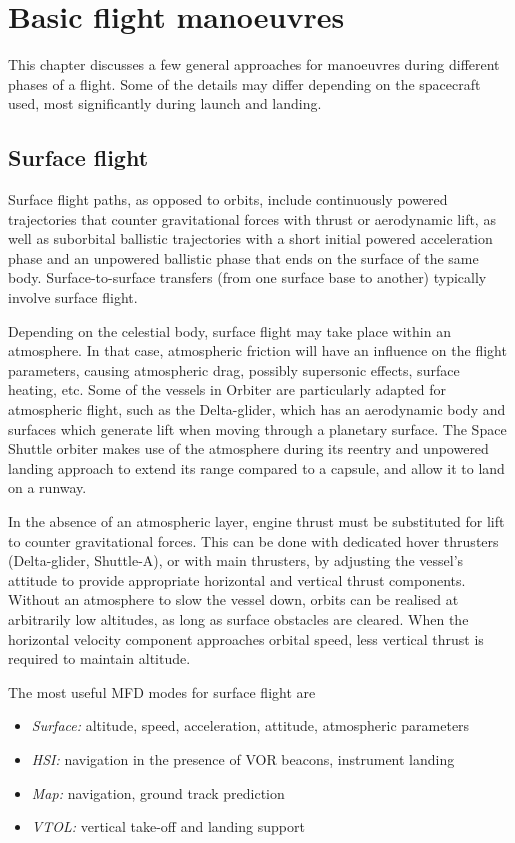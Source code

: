 \documentclass[Orbiter User Manual.tex]{subfiles}
\begin{document}
\section{Basic flight manoeuvres}
\label{sec:basic_flight}
This chapter discusses a few general approaches for manoeuvres during different
phases of a flight. Some of the details may differ depending on the spacecraft
used, most significantly during launch and landing.


\subsection{Surface flight}
Surface flight paths, as opposed to orbits, include continuously powered
trajectories that counter gravitational forces with thrust or aerodynamic lift,
as well as suborbital ballistic trajectories with a short initial powered
acceleration phase and an unpowered ballistic phase that ends on the surface of
the same body. Surface-to-surface transfers (from one surface base to another)
typically involve surface flight.

Depending on the celestial body, surface flight may take place within an
atmosphere. In that case, atmospheric friction will have an influence on the
flight parameters, causing atmospheric drag, possibly supersonic effects,
surface heating, etc. Some of the vessels in Orbiter are particularly adapted
for atmospheric flight, such as the Delta-glider, which has an aerodynamic body
and surfaces which generate lift when moving through a planetary surface. The
Space Shuttle orbiter makes use of the atmosphere during its reentry and
unpowered landing approach to extend its range compared to a capsule, and allow
it to land on a runway.

In the absence of an atmospheric layer, engine thrust must be substituted for
lift to counter gravitational forces. This can be done with dedicated hover
thrusters (Delta-glider, Shuttle-A), or with main thrusters, by adjusting the
vessel's attitude to provide appropriate horizontal and vertical thrust
components. Without an atmosphere to slow the vessel down, orbits can be
realised at arbitrarily low altitudes, as long as surface obstacles are cleared.
When the horizontal velocity component approaches orbital speed, less vertical
thrust is required to maintain altitude.

The most useful MFD modes for surface flight are

\begin{itemize}
	\item \emph{Surface:} altitude, speed, acceleration, attitude, atmospheric
		parameters
	\item \emph{HSI:} navigation in the presence of VOR beacons, instrument
		landing
	\item \emph{Map:} navigation, ground track prediction
	\item \emph{VTOL:} vertical take-off and landing support
\end{itemize}
\end{document}
